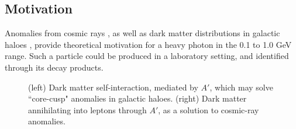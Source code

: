 \documentclass[b1]{sciposter}
\begin{document}
\begin{multicols}{3}
	\section*{Motivation}
Anomalies from cosmic rays
\cite{Finkbeiner:2010sm}, as well as dark matter distributions in galactic haloes \cite{Vogelsberger:2012ku}, provide theoretical motivation for a heavy photon in the 0.1 to 1.0 GeV range.  Such a particle could be produced in a laboratory setting, and identified through its decay products.

\begin{figure}
\begin{center}

\label{default}
\end{center}
\caption{(left) Dark matter self-interaction, mediated by $A'$, which may solve ``core-cusp" anomalies in galactic haloes.  (right) Dark matter annihilating into leptons through $A'$, as a solution to cosmic-ray anomalies.}
\end{figure}


\end{multicols}
\end{document}
